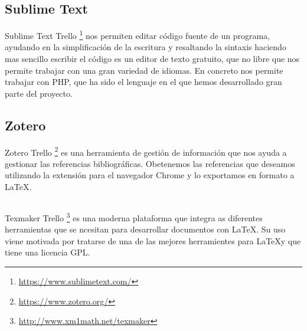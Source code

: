 \subsection{Sublime Text}

Sublime Text 
Trello \footnote{\url{https://www.sublimetext.com/}} nos permiten editar código fuente de un programa, ayudando en la simplificación de la escritura y resaltando la sintaxis haciendo mas sencillo escribir el código es un editor de texto gratuito, que no libre que nos permite trabajar con una gran variedad de idiomas. En concreto nos permite trabajar con PHP, que ha sido el lenguaje en el que hemos desarrollado gran parte del proyecto.

\subsection{Zotero}

Zotero 
Trello \footnote{\url{https://www.zotero.org/}} es una herramienta de gestión de información que  nos ayuda a gestionar las referencias bibliográficas. Obetenemos las referencias que deseamos utilizando la extensión para el navegador Chrome y lo exportamos en formato \BibTeX{} a \LaTeX.

\subsection{\TeXmaker}

Texmaker 
Trello \footnote{\url{http://www.xm1math.net/texmaker}} es una moderna plataforma que integra as diferentes herramientas que se ncesitan para desarrollar documentos con \LaTeX. Su uso viene motivada por tratarse de una de las mejores herramientes para \LaTeX y que tiene una licencia GPL.

